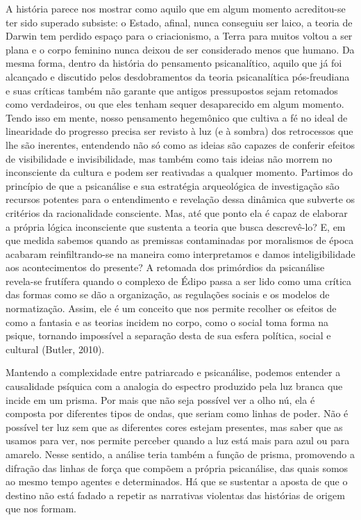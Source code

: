 A história parece nos mostrar como aquilo que em algum momento
acreditou-se ter sido superado subsiste: o Estado, afinal, nunca
conseguiu ser laico, a teoria de Darwin tem perdido espaço para o
criacionismo, a Terra para muitos voltou a ser plana e o corpo feminino
nunca deixou de ser considerado menos que humano. Da mesma forma, dentro
da história do pensamento psicanalítico, aquilo que já foi alcançado e
discutido pelos desdobramentos da teoria psicanalítica pós-freudiana e
suas críticas também não garante que antigos pressupostos sejam
retomados como verdadeiros, ou que eles tenham sequer desaparecido em
algum momento. Tendo isso em mente, nosso pensamento hegemônico que
cultiva a fé no ideal de linearidade do progresso precisa ser revisto à
luz (e à sombra) dos retrocessos que lhe são inerentes, entendendo não
só como as ideias são capazes de conferir efeitos de visibilidade e
invisibilidade, mas também como tais ideias não morrem no inconsciente
da cultura e podem ser reativadas a qualquer momento. Partimos do
princípio de que a psicanálise e sua estratégia arqueológica de
investigação são recursos potentes para o entendimento e revelação dessa
dinâmica que subverte os critérios da racionalidade consciente. Mas, até
que ponto ela é capaz de elaborar a própria lógica inconsciente que
sustenta a teoria que busca descrevê-lo? E, em que medida sabemos quando
as premissas contaminadas por moralismos de época acabaram
reinfiltrando-se na maneira como interpretamos e damos inteligibilidade
aos acontecimentos do presente? A retomada dos primórdios da psicanálise
revela-se frutífera quando o complexo de Édipo passa a ser lido como uma
crítica das formas como se dão a organização, as regulações sociais e os
modelos de normatização. Assim, ele é um conceito que nos permite
recolher os efeitos de como a fantasia e as teorias incidem no corpo,
como o social toma forma na psique, tornando impossível a separação
desta de sua esfera política, social e cultural (Butler, 2010).

Mantendo a complexidade entre patriarcado e psicanálise, podemos
entender a causalidade psíquica com a analogia do espectro produzido
pela luz branca que incide em um prisma. Por mais que não seja possível
ver a olho nú, ela é composta por diferentes tipos de ondas, que seriam
como linhas de poder. Não é possível ter luz sem que as diferentes cores
estejam presentes, mas saber que as usamos para ver, nos permite
perceber quando a luz está mais para azul ou para amarelo. Nesse
sentido, a análise teria também a função de prisma, promovendo a
difração das linhas de força que compõem a própria psicanálise, das
quais somos ao mesmo tempo agentes e determinados. Há que se sustentar a
aposta de que o destino não está fadado a repetir as narrativas
violentas das histórias de origem que nos formam.

